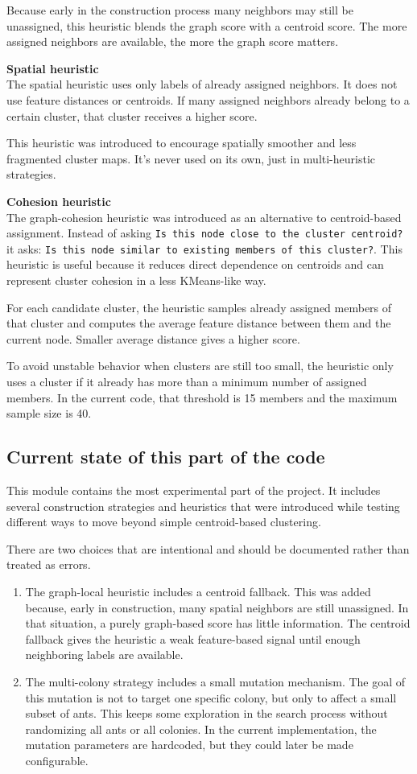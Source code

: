 \documentclass[11pt]{article}
\begin{document}
Because early in the construction process many neighbors may still be unassigned, this heuristic blends the graph score with a centroid score. The more assigned neighbors are available, the more the graph score matters.


\textbf{Spatial heuristic} \\
The spatial heuristic uses only labels of already assigned neighbors. It does not use feature distances or centroids. If many assigned neighbors already belong to a certain cluster, that cluster receives a higher score.

This heuristic was introduced to encourage spatially smoother and less fragmented cluster maps. It's never used on its own, just in multi-heuristic strategies.


\textbf{Cohesion heuristic} \\
The graph-cohesion heuristic was introduced as an alternative to centroid-based assignment. Instead of asking \texttt{Is this node close to the cluster centroid?} it asks: \texttt{Is this node similar to existing members of this cluster?}. This heuristic is useful because it reduces direct dependence on centroids and can represent cluster cohesion in a less KMeans-like way.

For each candidate cluster, the heuristic samples already assigned members of that cluster and computes the average feature distance between them and the current node. Smaller average distance gives a higher score.

To avoid unstable behavior when clusters are still too small, the heuristic only uses a cluster if it already has more than a minimum number of assigned members. In the current code, that threshold is 15 members and the maximum sample size is 40.


\subsection{Current state of this part of the code}
This module contains the most experimental part of the project. It includes several construction strategies and heuristics that were introduced while testing different ways to move beyond simple centroid-based clustering. 

There are  two choices that are intentional and should be documented rather than treated as errors.
\begin{enumerate}
  \item The graph-local heuristic includes a centroid fallback. This was added because, early in construction, many spatial neighbors are still unassigned. In that situation, a purely graph-based score has little information. The centroid fallback gives the heuristic a weak feature-based signal until enough neighboring labels are available.
  \item The multi-colony strategy includes a small mutation mechanism. The goal of this mutation is not to target one specific colony, but only to affect a small subset of ants. This keeps some exploration in the search process without randomizing all ants or all colonies. In the current implementation, the mutation parameters are hardcoded, but they could later be made configurable.
\end{enumerate}
\end{document}
